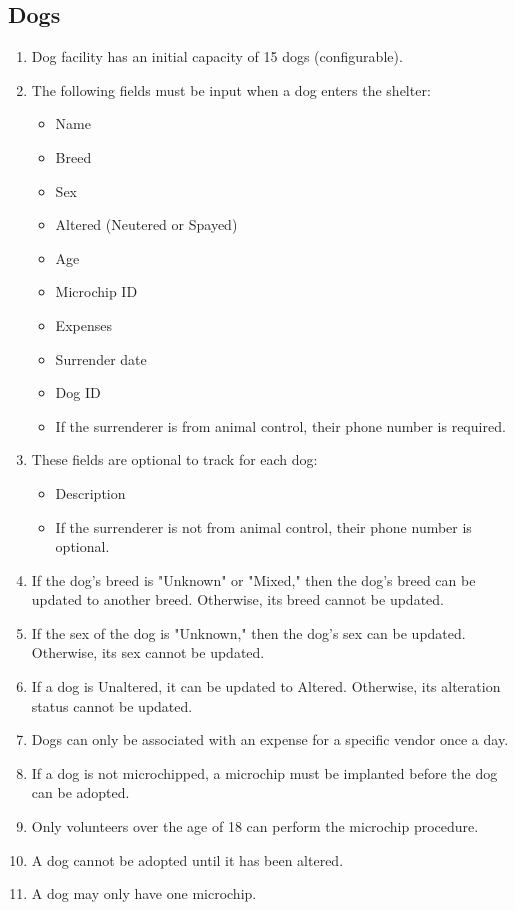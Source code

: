 \documentclass{article}
\begin{document}
\subsection{Dogs}
\begin{enumerate}
    \item Dog facility has an initial capacity of 15 dogs (configurable).
    \item The following fields must be input when a dog enters the shelter:
    \begin{itemize}
        \item Name
        \item Breed
        \item Sex
        \item Altered (Neutered or Spayed)
        \item Age
        \item Microchip ID
        \item Expenses
        \item Surrender date
        \item Dog ID
        \item If the surrenderer is from animal control, their phone number is required.
    \end{itemize}
    \item These fields are optional to track for each dog:
    \begin{itemize}
        \item Description
        \item If the surrenderer is not from animal control, their phone number is optional.
    \end{itemize}
    \item If the dog's breed is "Unknown" or "Mixed," then the dog's breed can be updated to another breed. Otherwise, its breed cannot be updated.
    \item If the sex of the dog is "Unknown," then the dog's sex can be updated. Otherwise, its sex cannot be updated.
    \item If a dog is Unaltered, it can be updated to Altered. Otherwise, its alteration status cannot be updated.
    \item Dogs can only be associated with an expense for a specific vendor once a day.
    \item If a dog is not microchipped, a microchip must be implanted before the dog can be adopted.
    \item Only volunteers over the age of 18 can perform the microchip procedure.
    \item A dog cannot be adopted until it has been altered.
    \item A dog may only have one microchip.
\end{enumerate}
\end{document}
